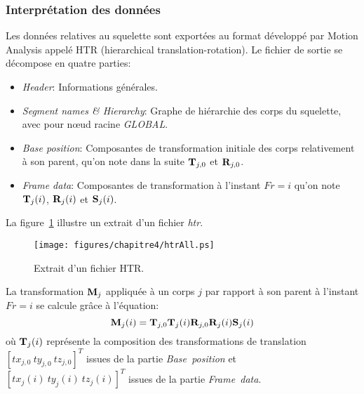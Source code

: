 \subsubsection{Interprétation des données}
Les données relatives au squelette sont exportées au format développé par Motion Analysis appelé
HTR (hierarchical translation-rotation). Le fichier de sortie se décompose en quatre parties:
\begin{itemize}
  \item \emph{Header}: Informations générales.
  \item \emph{Segment names \& Hierarchy}: Graphe de hiérarchie des corps du squelette, avec pour n\oe ud racine \emph{GLOBAL}.
  \item \emph{Base position}: Composantes de transformation initiale des corps relativement à son parent, 
    qu'on note dans la suite ${\mathbf{T}}_{j,0}$ et ${\mathbf{R}}_{j,0}$.
  \item \emph{Frame data}: Composantes de transformation à l'instant $Fr=i$ qu'on note ${\mathbf{T}}_j(i)$, ${\mathbf{R}}_j(i)$ et
    ${\mathbf{S}}_j(i)$.
\end{itemize}
La figure~\ref{fig:htr1} illustre un extrait d'un fichier \emph{htr}.
\begin{figure}[p]
  \begin{center}
    \texttt{[image: figures/chapitre4/htrAll.ps]}
  \end{center}
  \caption{Extrait d'un fichier HTR.}
  \label{fig:htr1}
\end{figure}
La transformation ${\mathbf{M}}_j$ appliquée à un corps $j$ par rapport
à son parent à l'instant $Fr=i$ se calcule gr\^ace à l'équation:
\begin{equation}
  \mbf{M}_j(i) = \mbf{T}_{j,0} \mbf{T}_j(i) \mbf{R}_{j,0} \mbf{R}_j(i) \mbf{S}_j(i)
  \label{eq:localMocapTransf}
\end{equation}
\noindent où ${\mathbf{T}}_j(i)$ représente la composition des transformations de translation 
$\left[tx_{j,0}~ty_{j,0}~tz_{j,0}\right]^T$
issues de la partie \emph{Base~position} et $\left[tx_j(i)~ty_j(i)~tz_j(i)\right]^T$ issues de la partie \emph{Frame~data}.
